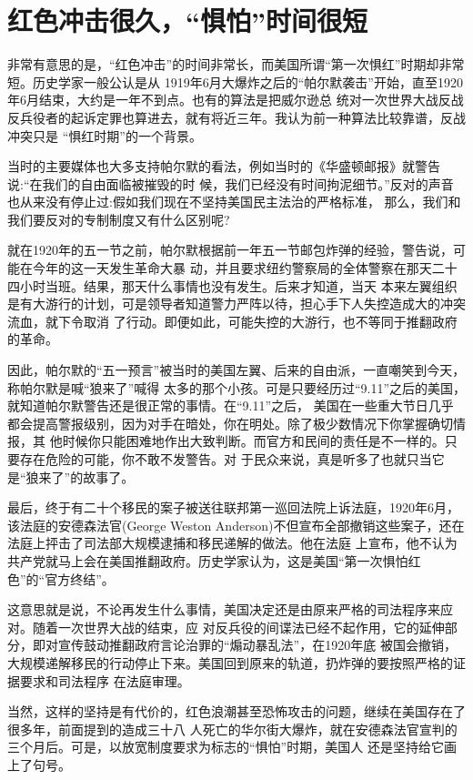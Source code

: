 \documentclass[10pt]{article}
\begin{document}
{\pagebreak
\section{红色冲击很久，``惧怕''时间很短}

非常有意思的是，``红色冲击''的时间非常长，而美国所谓``第一次惧红''时期却非常短。历史学家一般公认是从
1919年6月大爆炸之后的``帕尔默袭击''开始，直至1920年6月结束，大约是一年不到点。也有的算法是把威尔逊总
统对一次世界大战反战反兵役者的起诉定罪也算进去，就有将近三年。我认为前一种算法比较靠谱，反战冲突只是
``惧红时期''的一个背景。

当时的主要媒体也大多支持帕尔默的看法，例如当时的《华盛顿邮报》就警告说:``在我们的自由面临被摧毁的时
候，我们已经没有时间拘泥细节。''反对的声音也从来没有停止过:假如我们现在不坚持美国民主法治的严格标准，
那么，我们和我们要反对的专制制度又有什么区别呢?

就在1920年的五一节之前，帕尔默根据前一年五一节邮包炸弹的经验，警告说，可能在今年的这一天发生革命大暴
动，并且要求纽约警察局的全体警察在那天二十四小时当班。结果，那天什么事情也没有发生。后来才知道，当天
本来左翼组织是有大游行的计划，可是领导者知道警力严阵以待，担心手下人失控造成大的冲突流血，就下令取消
了行动。即便如此，可能失控的大游行，也不等同于推翻政府的革命。

因此，帕尔默的``五一预言''被当时的美国左翼、后来的自由派，一直嘲笑到今天，称帕尔默是喊``狼来了''喊得
太多的那个小孩。可是只要经历过``9.11''之后的美国，就知道帕尔默警告还是很正常的事情。在``9.11''之后，
美国在一些重大节日几乎都会提高警报级别，因为对手在暗处，你在明处。除了极少数情况下你掌握确切情报，其
他时候你只能困难地作出大致判断。而官方和民间的责任是不一样的。只要存在危险的可能，你不敢不发警告。对
于民众来说，真是听多了也就只当它是``狼来了''的故事了。

最后，终于有二十个移民的案子被送往联邦第一巡回法院上诉法庭，1920年6月，该法庭的安德森法官(George
Weston Anderson)不但宣布全部撤销这些案子，还在法庭上抨击了司法部大规模逮捕和移民递解的做法。他在法庭
上宣布，他不认为共产党就马上会在美国推翻政府。历史学家认为，这是美国``第一次惧怕红色''的``官方终结''。

这意思就是说，不论再发生什么事情，美国决定还是由原来严格的司法程序来应对。随着一次世界大战的结束，应
对反兵役的间谍法已经不起作用，它的延伸部分，即对宣传鼓动推翻政府言论治罪的``煽动暴乱法''，在1920年底
被国会撤销，大规模递解移民的行动停止下来。美国回到原来的轨道，扔炸弹的要按照严格的证据要求和司法程序
在法庭审理。

当然，这样的坚持是有代价的，红色浪潮甚至恐怖攻击的问题，继续在美国存在了很多年，前面提到的造成三十八
人死亡的华尔街大爆炸，就在安德森法官宣判的三个月后。可是，以放宽制度要求为标志的``惧怕''时期，美国人
还是坚持给它画上了句号。

}
\end{document}
